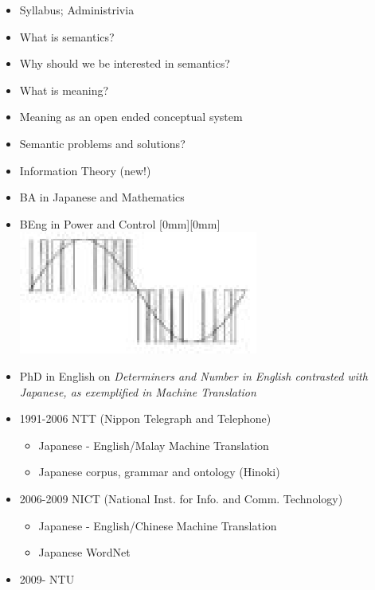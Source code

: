 \documentclass[headrule,footrule]{foils}
\begin{document}
\maketitle

%



\begin{itemize}
\item Syllabus; Administrivia
\item What is semantics?
\item Why should we be interested in semantics?
\item What is meaning?
\item Meaning as an open ended conceptual system
\item Semantic problems and solutions?
\item Information Theory (new!)
\end{itemize}


\begin{itemize}\addtolength{\itemsep}{-3mm}
\item BA in Japanese and Mathematics 
\item BEng in Power and Control %
  \raisebox{-2ex}[0mm][0mm]{\includegraphics{pics/pwm.eps}}
\item PhD in English on  \textit{Determiners and Number in English
  contrasted with Japanese,  as exemplified in Machine
  Translation} 
\item 1991-2006 NTT (Nippon Telegraph and Telephone)
  \begin{itemize}
  \item Japanese - English/Malay Machine Translation
  \item Japanese corpus, grammar and ontology (Hinoki)
  \end{itemize}
\item 2006-2009 NICT (National Inst. for Info. and Comm. Technology)
  \begin{itemize}
  \item Japanese - English/Chinese Machine Translation
  \item Japanese WordNet
 
 \end{itemize}
\item 2009- NTU
\end{itemize}
\end{document}
